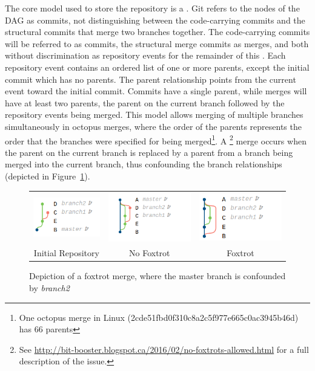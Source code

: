 The core model used to store the repository is a . Git refers to the nodes of the DAG as commits,
not distinguishing between the code-carrying commits and the structural
commits that merge two branches together. The code-carrying commits will
be referred to as commits, the structural merge commits as merges, and
both without discrimination as repository events for the remainder of
this \paper{}. Each repository event contains an ordered list of one
or more parents, except the initial commit which has no parents. The
parent relationship points from the current event toward the initial
commit. Commits have a single parent, while merges will have at least
two parents, the parent on the current branch followed by the repository
events being merged. This model allows merging of multiple branches
simultaneously in octopus merges, where the order of the parents
represents the order that the branches were specified for being
merged\footnote{One octopus merge in Linux
  (2cde51fbd0f310c8a2c5f977e665c0ac3945b46d) has 66 parents}.
A \foxtrot\footnote{See
  \url{http://bit-booster.blogspot.ca/2016/02/no-foxtrots-allowed.html}
  for a full description of the issue.} merge occurs when the parent on
the current branch is replaced by a parent from a branch being merged
into the current branch, thus confounding the branch relationships
(depicted in Figure~\ref{fig:foxtrot_steps}).

\begin{figure}[htpb]
  \centering
  \begin{tabular}{ccc}
    \includegraphics[width=114px]{Figures/background/foxtrot_initial.png} &
    \includegraphics[width=145px]{Figures/background/foxtrot_good.png} &
    \includegraphics[width=145px]{Figures/background/foxtrot_bad.png} \\
    Initial Repository & No Foxtrot & Foxtrot
  \end{tabular}
  \caption{Depiction of a foxtrot merge, where the master branch is
    confounded by \emph{branch2}}
  \label{fig:foxtrot_steps}
\end{figure}

